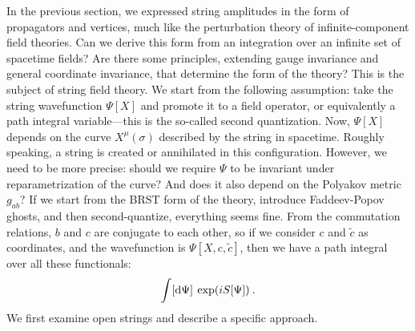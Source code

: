 In the previous section, we expressed string amplitudes in the form of propagators and vertices, much like the perturbation theory of infinite-component field theories. 
Can we derive this form from an integration over an infinite set of spacetime fields? Are there some principles, extending gauge invariance and general coordinate invariance, that determine the form of the theory? 
This is the subject of string field theory.
We start from the following assumption: take the string wavefunction $\Psi[X]$ and promote it to a field operator, or equivalently a path integral variable—this is the so-called second quantization. 
Now, $\Psi[X]$ depends on the curve $X^{\mu}(\sigma)$ described by the string in spacetime. Roughly speaking, a string is created or annihilated in this configuration. 
However, we need to be more precise: should we require $\Psi$ to be invariant under reparametrization of the curve? And does it also depend on the Polyakov metric $g_{ab}$?
If we start from the BRST form of the theory, introduce Faddeev-Popov ghosts, and then second-quantize, everything seems fine. 
From the commutation relations, $b$ and $c$ are conjugate to each other, so if we consider $c$ and $\tilde{c}$ as coordinates, and the wavefunction is $\Psi[X, c, \tilde{c}]$, 
then we have a path integral over all these functionals:
\begin{equation}
	\int[\mathrm{d} \Psi] \: \exp (i S[\Psi]) \:.
	\label{9.6.1}
\end{equation}
We first examine open strings and describe a specific approach. 

